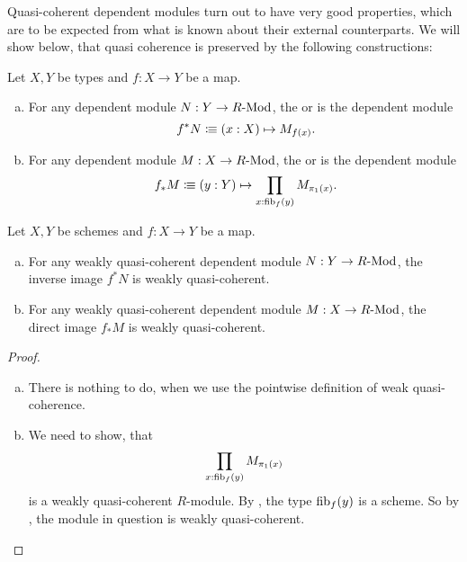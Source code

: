 Quasi-coherent dependent modules turn out to have very good properties,
which are to be expected from what is known about their external counterparts.
We will show below, that quasi coherence is preserved by the following constructions:

\begin{definition}
  \label{pullback-push-forward}
  Let $X,Y$ be types and $f:X\to Y$ be a map.
  \begin{enumerate}[(a)]
  \item {} For any dependent module $N:Y\to R\text{-}\mathrm{Mod}$,
    the  or  is the dependent module
    \[
      f^*N\colonequiv (x:X) \mapsto M_{f(x)}\rlap{.}
    \]
  \item {} For any dependent module $M:X\to R\text{-}\mathrm{Mod}$,
    the  or  is the dependent module
    \[
      f_*M\colonequiv (y:Y) \mapsto \prod_{x:\fib_f(y)}M_{\pi_1(x)}\rlap{.}
    \]
  \end{enumerate}
\end{definition}

\begin{theorem}%
  \label{pullback-push-forward-qcoh}
  Let $X,Y$ be schemes and $f:X\to Y$ be a map.
  \begin{enumerate}[(a)]
  \item For any weakly quasi-coherent dependent module $N:Y\to R\text{-}\mathrm{Mod}$,
    the inverse image $f^*N$ is weakly quasi-coherent.
  \item For any weakly quasi-coherent dependent module $M:X\to R\text{-}\mathrm{Mod}$,
    the direct image $f_*M$ is weakly quasi-coherent.
  \end{enumerate}
\end{theorem}

\begin{proof}
  \begin{enumerate}[(a)]
  \item There is nothing to do, when we use the pointwise definition of weak quasi-coherence. 
  \item We need to show, that
    \[
      \prod_{x:\mathrm{fib}_f(y)}M_{\pi_1(x)}
    \]
    is a weakly quasi-coherent $R$-module.
    By ,
    the type $\mathrm{fib}_f(y)$ is a scheme.
    So by ,
    the module in question is weakly quasi-coherent.
  \end{enumerate}
\end{proof}

